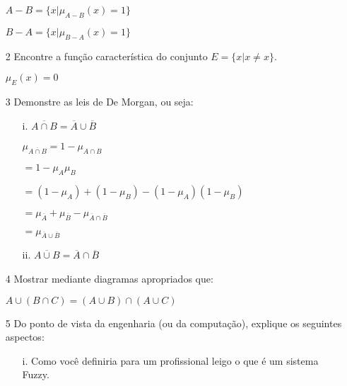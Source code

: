 \documentclass{report}
\begin{document}
\begin{enumerate}
$A - B = \lbrace x \vert \mu_{A - B }(x) = 1 \rbrace$

$B - A = \lbrace x \vert \mu_{B - A }(x) = 1 \rbrace$

\item[2] Encontre a função característica do conjunto $E = \{ x | x \neq x \}$.

$ \mu_E(x) = 0$ 

\item[3] Demonstre as leis de De Morgan, ou seja:

\begin{enumerate}
    \item[i.] $\overline{A \cap B} = \overline{A} \cup \overline{B}$

    $\mu_{\overline{A \cap B}} = 1 - \mu_{A \cap B} $
    
\hspace{0.9 cm}    $ = 1 - \mu_A \mu_B$

 \hspace{0.9 cm}   $ = (1 - \mu_A) + (1 - \mu_B) - (1 - \mu_A)(1-\mu_B)$

 \hspace{0.9 cm}   $ = \mu_{\overline{A}} + \mu_{\overline{B}} - \mu_{\overline{A}\cap\overline{B}}$

\hspace{0.9 cm}  $ = \mu_{\overline{A}\cup\overline{B}} $ 

    \item[ii.] $\overline{A \cup B} = \overline{A} \cap \overline{B}$

\end{enumerate}


\item[4] Mostrar mediante diagramas apropriados que:

$A \cup (B \cap C) = (A \cup B) \cap (A \cup C)$

\item[5] Do ponto de vista da engenharia (ou da computação), explique os seguintes aspectos:

\begin{enumerate}
\item[i.] Como você definiria para um profissional leigo o que é um sistema Fuzzy.


\end{enumerate}
\end{enumerate}
\end{document}

